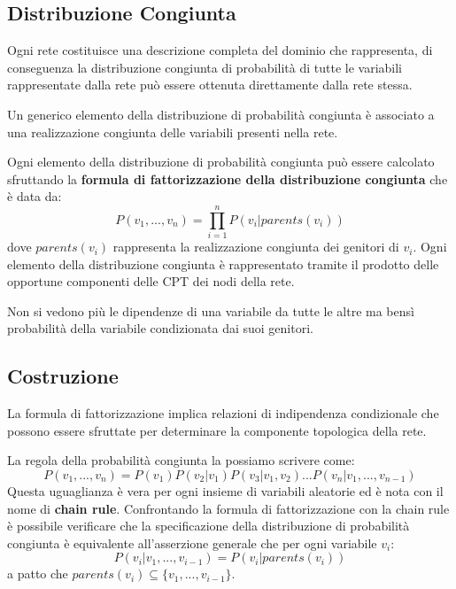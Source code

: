 \subsection{Distribuzione Congiunta}
Ogni rete costituisce una descrizione completa del dominio che rappresenta, di
conseguenza la distribuzione congiunta di probabilità di tutte le variabili
rappresentate dalla rete può essere ottenuta direttamente dalla rete stessa.

Un generico elemento della distribuzione di probabilità congiunta è associato a
una realizzazione congiunta delle variabili presenti nella rete.

Ogni elemento della distribuzione di probabilità congiunta può essere calcolato
sfruttando la \textbf{formula di fattorizzazione della distribuzione congiunta}
che è data da:
\begin{equation}
    P(v_1,...,v_n) = \prod_{i=1}^{n} P(v_i|parents(v_i))
\end{equation}
dove $parents(v_i)$ rappresenta la realizzazione congiunta dei genitori di $v_i$.
Ogni elemento della distribuzione congiunta è rappresentato tramite il prodotto
delle opportune componenti delle CPT dei nodi della rete.
\begin{nota}
    Non si vedono più le dipendenze di una variabile da tutte le altre ma bensì
    probabilità della variabile condizionata dai suoi genitori.
\end{nota}
\subsection{Costruzione}
La formula di fattorizzazione implica relazioni di indipendenza condizionale
che possono essere sfruttate per determinare la componente topologica della rete.

La regola della probabilità congiunta la possiamo scrivere come:
\begin{equation}
    P(v_1,...,v_n) = P(v_1)P(v_2|v_1)P(v_3|v_1,v_2)...P(v_n|v_1,...,v_{n-1})
\end{equation}
Questa uguaglianza è vera per ogni insieme di variabili aleatorie ed è nota con
il nome di \textbf{chain rule}. Confrontando la formula di fattorizzazione con
la chain rule è possibile verificare che la specificazione della distribuzione
di probabilità congiunta è equivalente all'asserzione generale che per ogni
variabile $v_i$:
\begin{equation}
    P(v_i|v_1,...,v_{i-1}) = P(v_i|parents(v_i))
\end{equation}
a patto che $parents(v_i) \subseteq \{v_1,...,v_{i-1}\}$.


